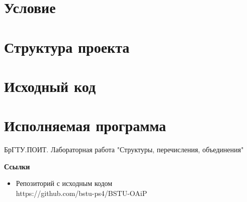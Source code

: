 \documentclass[12pt, a4paper]{article}
\begin{document}
\maketitle
\setcounter{page}{2}

\renewcommand{\contentsname}{Содержание}
\tableofcontents
\newpage

\labheading


\labreport

\section{Условие}


\section{Структура проекта}


\newpage
\section{Исходный код}


\newpage
\section{Исполняемая программа}



\newpage
\begin{thebibliography}{3}
    \bibitem{}
    БрГТУ.ПОИТ. Лабораторная работа "Структуры, перечисления, объединения"
\end{thebibliography}

\textbf{Ссылки}
\begin{itemize}
    \item Репозиторий с исходным кодом\\
    https://github.com/bstu-ps4/BSTU-OAiP
\end{itemize}
\end{document}

